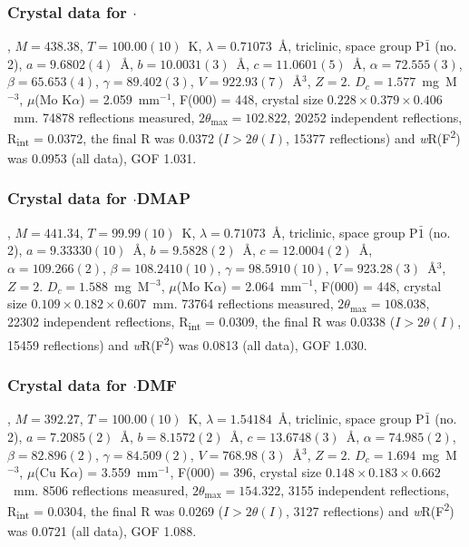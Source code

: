 \begin{refsection}
\subsubsection{Crystal data for \texorpdfstring{$\cdot$}{C22 H21 N3 O2 Se}}
, $M=438.38$, $T=100.00(10)$~K, $\lambda=0.71073$~\AA, triclinic, space group P$\bar{1}$ (no. 2), $a = 9.6802(4)$~\AA, $b = 10.0031(3)$~\AA, $c = 11.0601(5)$~\AA, $\alpha = 72.555(3)$\degree, $\beta = 65.653(4)$\degree, $\gamma = 89.402(3)$\degree, $V = 922.93(7)$~\AA$^{3}$, $Z = 2$. $D_{c}= 1.577$~mg~M$^{-3}$, $\mu$(Mo K$\alpha$) = 2.059~mm$^{-1}$, F(000) = 448, crystal size $0.228 \times 0.379 \times 0.406$~mm. 74878 reflections measured, $2\theta_{\mathrm{max}}=102.822$\degree, 20252 independent reflections, R\textsubscript{int} = 0.0372, the final R was 0.0372 ($I > 2\theta(I)$, 15377 reflections) and \emph{w}R(F\textsuperscript{2}) was 0.0953 (all data), GOF 1.031.

\subsubsection{Crystal data for \texorpdfstring{$\cdot$DMAP}{C20 H18 N4 O3 Se}}
, $M=441.34$, $T=99.99(10)$~K, $\lambda=0.71073$~\AA, triclinic, space group P$\bar{1}$ (no. 2), $a = 9.33330(10)$~\AA, $b = 9.5828(2)$~\AA, $c = 12.0004(2)$~\AA, $\alpha = 109.266(2)$\degree, $\beta = 108.2410(10)$\degree, $\gamma = 98.5910(10)$\degree, $V = 923.28(3)$~\AA$^{3}$, $Z = 2$. $D_{c}= 1.588$~mg~M$^{-3}$, $\mu$(Mo K$\alpha$) = 2.064~mm$^{-1}$, F(000) = 448, crystal size $0.109 \times 0.182 \times 0.607$~mm. 73764 reflections measured, $2\theta_{\mathrm{max}}=108.038$\degree, 22302 independent reflections, R\textsubscript{int} = 0.0309, the final R was 0.0338 ($I > 2\theta(I)$, 15459 reflections) and \emph{w}R(F\textsuperscript{2}) was 0.0813 (all data), GOF 1.030.

\subsubsection{Crystal data for \texorpdfstring{$\cdot$DMF}{C16 H15 N3 O4 Se}}
, $M=392.27$, $T=100.00(10)$~K, $\lambda=1.54184$~\AA, triclinic, space group P$\bar{1}$ (no. 2), $a = 7.2085(2)$~\AA, $b = 8.1572(2)$~\AA, $c = 13.6748(3)$~\AA, $\alpha = 74.985(2)$\degree, $\beta = 82.896(2)$\degree, $\gamma = 84.509(2)$\degree, $V = 768.98(3)$~\AA$^{3}$, $Z = 2$. $D_{c}= 1.694$~mg~M$^{-3}$, $\mu$(Cu K$\alpha$) = 3.559~mm$^{-1}$, F(000) = 396, crystal size $0.148 \times 0.183 \times 0.662$~mm. 8506 reflections measured, $2\theta_{\mathrm{max}}=154.322$\degree, 3155 independent reflections, R\textsubscript{int} = 0.0304, the final R was 0.0269 ($I > 2\theta(I)$, 3127 reflections) and \emph{w}R(F\textsuperscript{2}) was 0.0721 (all data), GOF 1.088.


\end{refsection}
